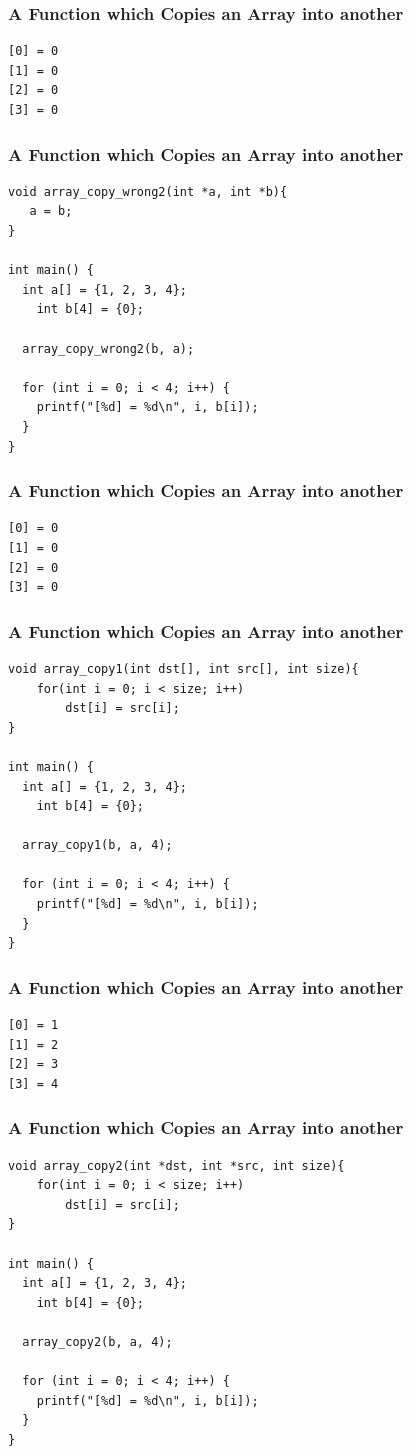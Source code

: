 \documentclass{../c-lecture}
\begin{document}
\begin{frame}[fragile]
  \frametitle{A Function which Copies an Array into another}
  \begin{verbatim}
[0] = 0
[1] = 0
[2] = 0
[3] = 0
  \end{verbatim}
\end{frame}

\begin{frame}[fragile]
  \frametitle{A Function which Copies an Array into another}
  \begin{verbatim}
void array_copy_wrong2(int *a, int *b){
   a = b;
}

int main() {
  int a[] = {1, 2, 3, 4};
	int b[4] = {0};

  array_copy_wrong2(b, a);

  for (int i = 0; i < 4; i++) {
    printf("[%d] = %d\n", i, b[i]);
  }
}
  \end{verbatim}
\end{frame}

\begin{frame}[fragile]
  \frametitle{A Function which Copies an Array into another}
  \begin{verbatim}
[0] = 0
[1] = 0
[2] = 0
[3] = 0
  \end{verbatim}
\end{frame}

\begin{frame}[fragile]
  \frametitle{A Function which Copies an Array into another}
  \scriptsize
  \begin{verbatim}
void array_copy1(int dst[], int src[], int size){
	for(int i = 0; i < size; i++)
		dst[i] = src[i];
}

int main() {
  int a[] = {1, 2, 3, 4};
	int b[4] = {0};

  array_copy1(b, a, 4);

  for (int i = 0; i < 4; i++) {
    printf("[%d] = %d\n", i, b[i]);
  }
}
  \end{verbatim}
\end{frame}

\begin{frame}[fragile]
  \frametitle{A Function which Copies an Array into another}
  \begin{verbatim}
[0] = 1
[1] = 2
[2] = 3
[3] = 4
  \end{verbatim}
\end{frame}

\begin{frame}[fragile]
  \frametitle{A Function which Copies an Array into another}
  \scriptsize
  \begin{verbatim}
void array_copy2(int *dst, int *src, int size){
	for(int i = 0; i < size; i++)
		dst[i] = src[i];
}

int main() {
  int a[] = {1, 2, 3, 4};
	int b[4] = {0};

  array_copy2(b, a, 4);

  for (int i = 0; i < 4; i++) {
    printf("[%d] = %d\n", i, b[i]);
  }
}
  \end{verbatim}
\end{frame}
\end{document}
